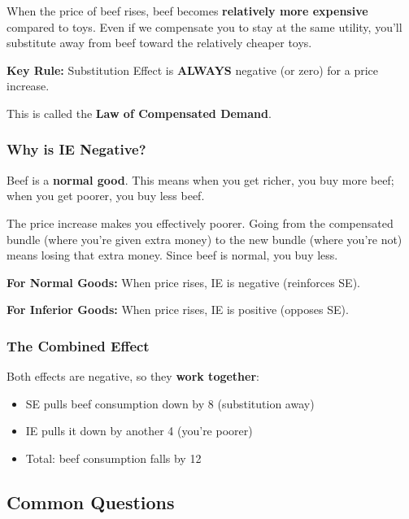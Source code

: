 \documentclass[11pt]{article}
\begin{document}
When the price of beef rises, beef becomes \textbf{relatively more expensive} compared to toys. Even if we compensate you to stay at the same utility, you'll substitute away from beef toward the relatively cheaper toys.

\begin{center}
\colorbox{green!20}{
\textbf{Key Rule:} Substitution Effect is \textbf{ALWAYS} negative (or zero) for a price increase.
}
\end{center}

This is called the \textbf{Law of Compensated Demand}.

\subsubsection{Why is IE Negative?}

Beef is a \textbf{normal good}. This means when you get richer, you buy more beef; when you get poorer, you buy less beef.

The price increase makes you effectively poorer. Going from the compensated bundle (where you're given extra money) to the new bundle (where you're not) means losing that extra money. Since beef is normal, you buy less.

\begin{center}
\colorbox{yellow!30}{
\begin{minipage}{0.9\textwidth}
\textbf{For Normal Goods:} When price rises, IE is negative (reinforces SE).

\textbf{For Inferior Goods:} When price rises, IE is positive (opposes SE).
\end{minipage}
}
\end{center}

\subsubsection{The Combined Effect}

Both effects are negative, so they \textbf{work together}:
\begin{itemize}
    \item SE pulls beef consumption down by 8 (substitution away)
    \item IE pulls it down by another 4 (you're poorer)
    \item Total: beef consumption falls by 12
\end{itemize}

\subsection{Common Questions}
\end{document}
